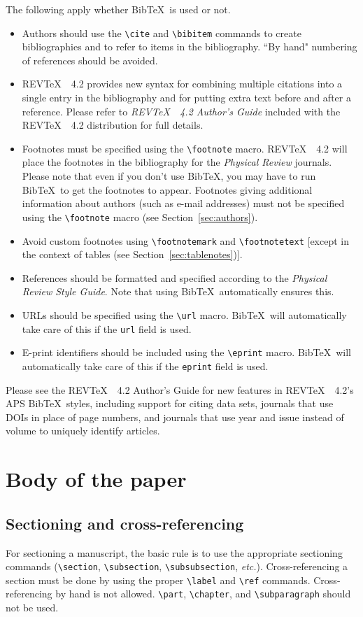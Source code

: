 \documentclass[twocolumn,secnumarabic,amssymb, nobibnotes, aps, prd]{revtex4-2}
\newcommand{\revtex}{REV\TeX\ }
\newcommand{\macro}[1]{\texttt{\textbackslash#1}}
\newcommand{\m}[1]{\macro{#1}}
\begin{document}
The following apply whether
Bib\TeX\ is used or not.  
\begin{itemize}
\item Authors should use the \m{cite} and \m{bibitem} commands to create
bibliographies and to refer to items in the bibliography. ``By hand"
numbering of references should be avoided.
\item \revtex~4.2 provides new syntax for combining multiple citations into a single entry in the bibliography and for putting extra text before and after a reference. Please refer to \textit{\revtex~4.2 Author's Guide} included with the \revtex~4.2 distribution for full details.
\item Footnotes must be specified using the \m{footnote}
macro. \revtex\ 4.2 will place the footnotes in
the bibliography for the \textit{Physical Review}
journals. Please note that even if you don't use Bib\TeX, you may have to run Bib\TeX\ to get the footnotes to appear. Footnotes giving additional information about authors (such
as e-mail addresses) must not be specified using the \m{footnote}
macro (see Section~\ref{sec:authors}).
\item Avoid custom footnotes using \m{footnotemark} and \m{footnotetext} [except in the context of tables (see
Section~\ref{sec:tablenotes})].
\item References should be formatted and specified according to the
\textit{Physical Review Style Guide}. Note that using Bib\TeX\ automatically ensures this.
\item URLs should be specified using the \m{url} macro. Bib\TeX\ will automatically take
care of this if the \texttt{url} field is used.
\item E-print identifiers should be included using the \m{eprint} macro. Bib\TeX\ will automatically take care of this if the \texttt{eprint} field is used.
\end{itemize}

Please see the \revtex~4.2 Author's Guide for new features in \revtex~4.2's APS Bib\TeX\ styles, including support for citing data sets, journals that use DOIs in place of page numbers, and journals that use year and issue instead of volume to uniquely identify articles.

\section{Body of the paper}
\subsection{Sectioning and cross-referencing}
For sectioning a manuscript, the basic rule is to use the appropriate
sectioning commands (\m{section}, \m{subsection}, \m{subsubsection},
\textit{etc.}). Cross-referencing a section must be done by using the
proper \m{label} and \m{ref} commands. Cross-referencing by hand is
not allowed. \m{part}, \m{chapter}, and \m{subparagraph} should not be
used.
\end{document}
